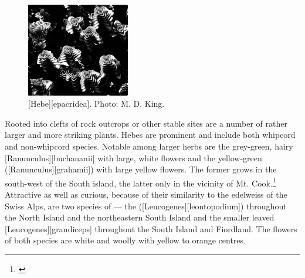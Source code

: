 \begin{figure}
	\includegraphics[width=0.4\textwidth]{graphics/figure106hebe.jpg}
	\centering
	\caption[\emph{Hebe epacridea}]{[Hebe][epacridea].
	Photo: M. D. King.}%
	\label{fig:106hebe}
\end{figure}

Rooted into clefts of rock outcrops or other stable sites are a number of rather larger and more striking plants.
Hebes are prominent and include both whipcord and non-whipcord species.
Notable among larger herbs are the grey-green, hairy [Ranunculus][buchananii] with large, white flowers and the yellow-green  ([Ranunculus][grahamii]) with large yellow flowers.
The former grows in the south-west of the South island, the latter only in the vicinity of Mt.
Cook.\footnote{\cite{wilson1978wild}}
Attractive as well as curious, because of their similarity to the edelweiss of the Swiss Alps, are two species of  --- the  ([Leucogenes][leontopodium]) throughout the North Island and the northeastern South Island and the smaller leaved  [Leucogenes][grandiceps] throughout the South Island and Fiordland.
The flowers of both species are white and woolly with yellow to orange centres.

